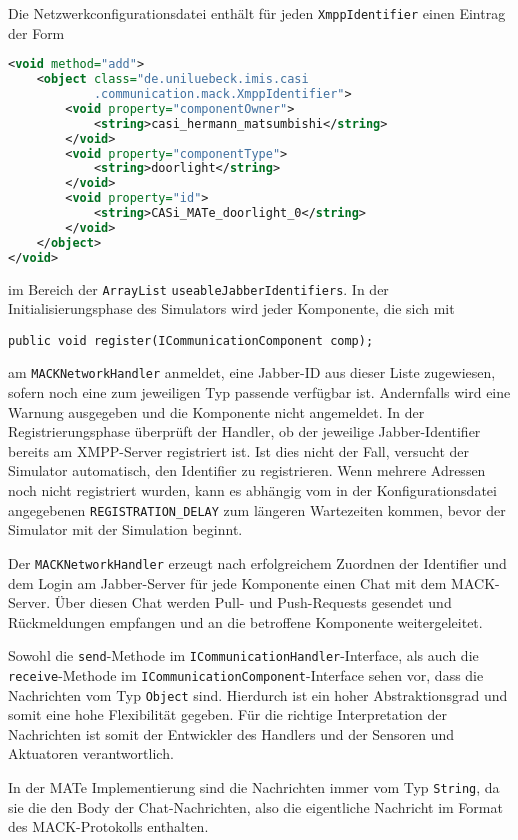 Die Netzwerkconfigurationsdatei enthält für jeden \texttt{XmppIdentifier} einen Eintrag der Form
\begin{lstlisting}[language=XML]
<void method="add">
	<object class="de.uniluebeck.imis.casi
			.communication.mack.XmppIdentifier">
		<void property="componentOwner">
			<string>casi_hermann_matsumbishi</string>
		</void>
		<void property="componentType">
			<string>doorlight</string>
		</void>
		<void property="id">
			<string>CASi_MATe_doorlight_0</string>
		</void>
	</object>
</void>
\end{lstlisting}
 im Bereich der \texttt{ArrayList} \texttt{useableJabberIdentifiers}. In der Initialisierungsphase des Simulators wird jeder Komponente, die sich mit \begin{lstlisting}
public void register(ICommunicationComponent comp);
\end{lstlisting}
am \texttt{MACKNetworkHandler} anmeldet, eine Jabber-ID aus dieser Liste zugewiesen, sofern noch eine zum jeweiligen Typ passende verfügbar ist. Andernfalls wird eine Warnung ausgegeben und die Komponente nicht angemeldet.
In der Registrierungsphase überprüft der Handler, ob der jeweilige Jabber-Identifier bereits am XMPP-Server registriert ist. Ist dies nicht der Fall, versucht der Simulator automatisch, den Identifier zu registrieren. Wenn mehrere Adressen noch nicht registriert wurden, kann es abhängig vom in der Konfigurationsdatei angegebenen \texttt{REGISTRATION\_DELAY} zum längeren Wartezeiten kommen, bevor der Simulator mit der Simulation beginnt. 

Der \texttt{MACKNetworkHandler} erzeugt nach erfolgreichem Zuordnen der Identifier und dem Login am Jabber-Server für jede Komponente einen Chat mit dem MACK-Server. Über diesen Chat werden Pull- und Push-Requests gesendet und Rückmeldungen empfangen und an die betroffene Komponente weitergeleitet.

Sowohl die \texttt{send}-Methode im \texttt{ICommunicationHandler}-Interface, als auch die \texttt{receive}-Methode im \texttt{ICommunicationComponent}-Interface sehen vor, dass die Nachrichten vom Typ \texttt{Object} sind. Hierdurch ist ein hoher Abstraktionsgrad und somit eine hohe Flexibilität gegeben. Für die richtige Interpretation der Nachrichten ist somit der Entwickler des Handlers und der Sensoren und Aktuatoren verantwortlich.

In der MATe Implementierung sind die Nachrichten immer vom Typ \texttt{String}, da sie die den Body der Chat-Nachrichten, also die eigentliche Nachricht im Format des MACK-Protokolls enthalten.

